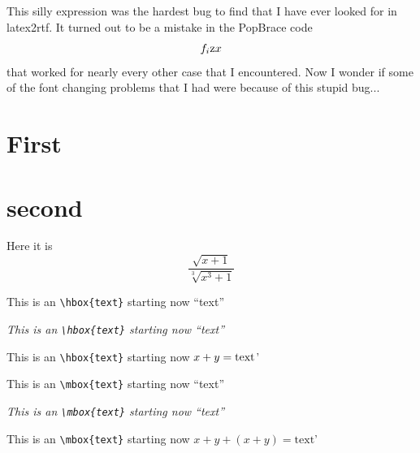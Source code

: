 ﻿\documentclass{article}
\begin{document}
This silly expression was the hardest bug to find that I have ever looked
for in latex2rtf.  It turned out to be a mistake in the PopBrace code
$$
f_i \hbox{z} x
$$
that worked for nearly every other case that I encountered.  Now I wonder
if some of the font changing problems that I had were because of this 
stupid bug...

\section{First}\section{second}Here it is
$$
\displaystyle\frac{\sqrt{x+1}} {\sqrt[3]{x^3+1}}
$$

This is an \verb#\hbox{text}# starting now ``\hbox{text}''

{\it This is an \verb#\hbox{text}# starting now ``\hbox{text}'' }

This is an \verb#\hbox{text}# starting now $x+y = \hbox{text}$'

This is an \verb#\mbox{text}# starting now ``\mbox{text}''

{\it This is an \verb#\mbox{text}# starting now ``\mbox{text}'' }

This is an \verb#\mbox{text}# starting now $x+y + (x+y) = \mbox{text}$'
\end{document}
